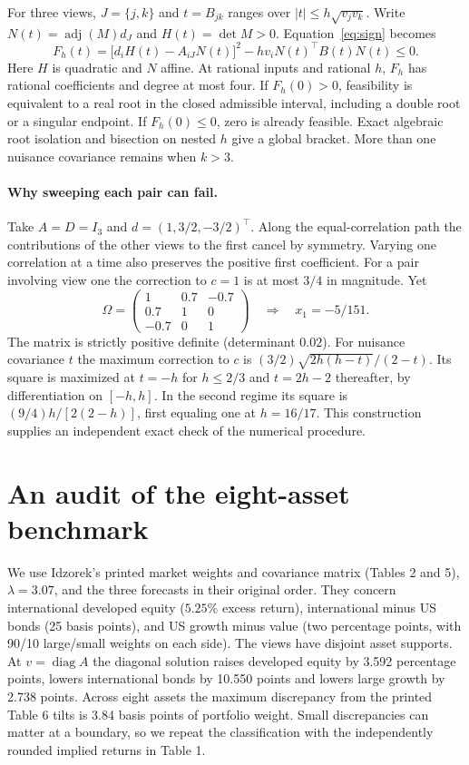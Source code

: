 \documentclass[11pt]{article}
\newcommand{\diag}{\operatorname{diag}}
\newcommand{\adj}{\operatorname{adj}}
\begin{document}
For three views, $J=\{j,k\}$ and $t=B_{jk}$ ranges over $|t|\le h\sqrt{v_jv_k}$. Write $N(t)=\adj(M)d_J$ and $H(t)=\det M>0$. Equation~\eqref{eq:sign} becomes
\[
 F_h(t)=\big[d_iH(t)-A_{iJ}N(t)\big]^2-hv_i N(t)^\top B(t)N(t)\le0.
\]
Here $H$ is quadratic and $N$ affine. At rational inputs and rational $h$, $F_h$ has rational coefficients and degree at most four. If $F_h(0)>0$, feasibility is equivalent to a real root in the closed admissible interval, including a double root or a singular endpoint. If $F_h(0)\le0$, zero is already feasible. Exact algebraic root isolation and bisection on nested $h$ give a global bracket. More than one nuisance covariance remains when $k>3$.

\paragraph{Why sweeping each pair can fail.}
Take $A=D=I_3$ and $d=(1,3/2,-3/2)^\top$. Along the equal-correlation path the contributions of the other views to the first cancel by symmetry. Varying one correlation at a time also preserves the positive first coefficient. For a pair involving view one the correction to $c=1$ is at most $3/4$ in magnitude. Yet
\[
 \Omega=\begin{pmatrix}1&0.7&-0.7\\0.7&1&0\\-0.7&0&1\end{pmatrix}
 \quad\Longrightarrow\quad x_1=-5/151 .
\]
The matrix is strictly positive definite (determinant $0.02$). For nuisance covariance $t$ the maximum correction to $c$ is $(3/2)\sqrt{2h(h-t)}/(2-t)$. Its square is maximized at $t=-h$ for $h\le2/3$ and $t=2h-2$ thereafter, by differentiation on $[-h,h]$. In the second regime its square is $(9/4)h/[2(2-h)]$, first equaling one at $h=16/17$. This construction supplies an independent exact check of the numerical procedure.

\section{An audit of the eight-asset benchmark}
We use Idzorek's printed market weights and covariance matrix (Tables 2 and 5), $\lambda=3.07$, and the three forecasts in their original order. They concern international developed equity ($5.25\%$ excess return), international minus US bonds (25 basis points), and US growth minus value (two percentage points, with 90/10 large/small weights on each side). The views have disjoint asset supports. At $v=\diag A$ the diagonal solution raises developed equity by 3.592 percentage points, lowers international bonds by 10.550 points and lowers large growth by 2.738 points. Across eight assets the maximum discrepancy from the printed Table 6 tilts is 3.84 basis points of portfolio weight. Small discrepancies can matter at a boundary, so we repeat the classification with the independently rounded implied returns in Table 1.
\end{document}

